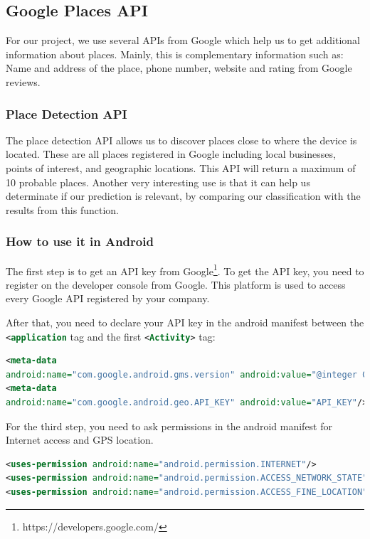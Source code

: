\subsection{Google Places API}
For our project, we use several APIs from Google which help us to get additional information about places. Mainly, this is complementary information such as: Name and address of the place, phone number, website and rating from Google reviews.

\subsubsection{Place Detection API}
The place detection API allows us to discover places close to where the device is located. These are all places registered in Google including local businesses, points of interest, and geographic locations. This API will return a maximum of 10 probable places.
Another very interesting use is that it can help us determinate if our prediction is relevant, by comparing our classification with the results from this function.
\newpage
\subsubsection{How to use it in Android}
The first step is to get an API key from Google\footnote{https://developers.google.com/}. To get the API key, you need to register on the developer console from Google. This platform is used to access every Google API registered by your company.

After that, you need to declare your API key in the android manifest between the \lstinline[language=XML]{<application} tag and the first \lstinline[language=XML]{<Activity>} tag:

\begin{lstlisting}[language=XML, basicstyle=\scriptsize]
<meta-data
android:name="com.google.android.gms.version" android:value="@integer Google_play_services_version"/>
<meta-data
android:name="com.google.android.geo.API_KEY" android:value="API_KEY"/>
\end{lstlisting}

For the third step, you need to ask permissions in the android manifest for Internet access and GPS location.
\begin{lstlisting}[language=XML, basicstyle=\scriptsize]
<uses-permission android:name="android.permission.INTERNET"/>
<uses-permission android:name="android.permission.ACCESS_NETWORK_STATE"/>
<uses-permission android:name="android.permission.ACCESS_FINE_LOCATION"/>
\end{lstlisting}

